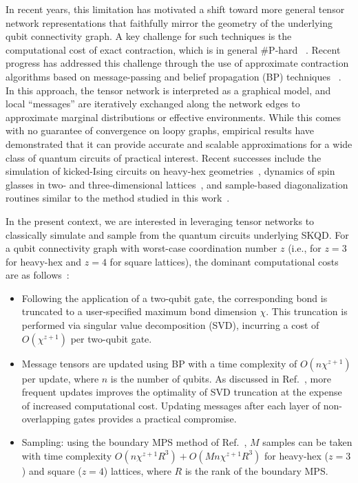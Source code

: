 \documentclass[
  reprint,            %
  amsmath,amssymb,
  aps,
  superscriptaddress, %
  longbibliography
]{revtex4-2}
\theoremstyle{definition}
\begin{document}
In recent years, this limitation has motivated a shift toward more general tensor network representations that faithfully mirror the geometry of the underlying qubit connectivity graph. A key challenge for such techniques is the computational cost of exact contraction, which is in general \#P-hard ~\cite{Schuch_ComputationalComplexity_2007}. Recent progress has addressed this challenge through the use of approximate contraction algorithms based on message-passing and belief propagation (BP) techniques ~\cite{Alkabetz_TensorNetworks_2021, Tindall_GaugingTensor_2023, Wang_TensorNetwork_2024}. In this approach, the tensor network is interpreted as a graphical model, and local ``messages'' are iteratively exchanged along the network edges to approximate marginal distributions or effective environments. While this comes with no guarantee of convergence on loopy graphs, empirical results have demonstrated that it can provide accurate and scalable approximations for a wide class of quantum circuits of practical interest. Recent successes include the simulation of kicked-Ising circuits on heavy-hex geometries~\cite{Tindall_EfficientTensor_2024}, dynamics of spin glasses in two- and three-dimensional lattices~\cite{Tindall_DynamicsDisordered_2025}, and sample-based diagonalization routines similar to the method studied in this work~\cite{rudolphSimulatingSamplingQuantum2025}.

In the present context, we are interested in leveraging tensor networks to classically simulate and sample from the quantum circuits underlying SKQD. For a qubit connectivity graph with worst-case coordination number $z$ (i.e., for $z=3$ for heavy-hex and $z=4$ for square lattices), the dominant computational costs are as follows~\cite{rudolphSimulatingSamplingQuantum2025}:
\begin{itemize}
    \item Following the application of a two-qubit gate, the corresponding bond is truncated to a user-specified maximum bond dimension $\chi$. This truncation is performed via singular value decomposition (SVD), incurring a cost of $O(\chi^{z+1})$ per two-qubit gate.
    \item Message tensors are updated using BP with a time complexity of $O(n \chi^{z+1})$ per update, where $n$ is the number of qubits. As discussed in Ref.~\cite{Tindall_EfficientTensor_2024}, more frequent updates improves the optimality of SVD truncation at the expense of increased computational cost. Updating messages after each layer of non-overlapping gates provides a practical compromise.
    \item Sampling: using the boundary MPS method of Ref.~\cite{rudolphSimulatingSamplingQuantum2025}, $M$ samples can be taken with time complexity $O(n \chi^{z+1} R^3) + O(M n \chi^{z+1}R^3)$ for heavy-hex ($z=3$) and square ($z=4$) lattices, where $R$ is the rank of the boundary MPS.
\end{itemize}
\end{document}
